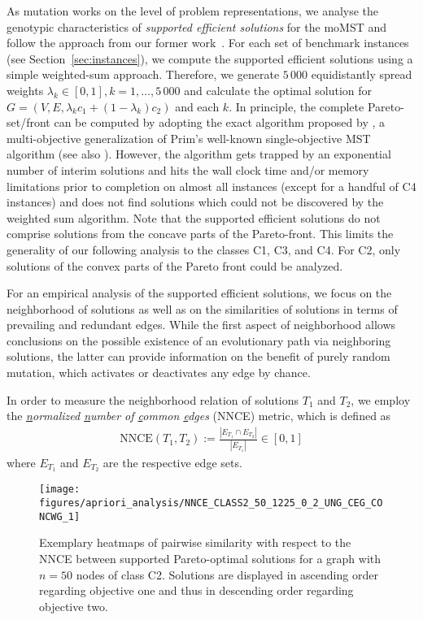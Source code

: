 \documentclass[twoside]{article}
\begin{document}
As mutation works on the level of problem representations, we analyse the genotypic characteristics of \emph{supported efficient solutions} for the moMST and follow the approach from our former work~\citep{BG2017ParetoBeneficial}. For each set of benchmark instances (see Section~\ref{sec:instances}), we compute the supported efficient solutions using a simple weighted-sum approach. Therefore, we generate $5\,000$ equidistantly spread weights $\lambda_k \in [0, 1], k = 1, \ldots, 5\,000$ and calculate the optimal solution for $G = (V, E, \lambda_k c_1 + (1 - \lambda_k)c_2)$ and each $k$. In principle, the complete Pareto-set/front can be computed by adopting the exact algorithm proposed by \citet{Corley1985}, a multi-objective generalization of Prim's well-known single-objective MST algorithm (see also \citet[p. 208ff]{Ehrgott2005}). However, the algorithm gets trapped by an exponential number of interim solutions and hits the wall clock time and/or memory limitations prior to completion on almost all instances (except for a handful of C4 instances) and does not find solutions which could not be discovered by the weighted sum algorithm. Note that the supported efficient solutions do not comprise solutions from the concave parts of the Pareto-front. This limits the generality of our following analysis to the classes C1, C3, and C4. For C2, only solutions of the convex parts of the Pareto front could be analyzed.

For an empirical analysis of the supported efficient solutions, we focus on the neighborhood of solutions as well as on the similarities of solutions in terms of prevailing and redundant edges. While the first aspect of neighborhood allows conclusions on the possible existence of an evolutionary path via neighboring solutions, the latter can provide information on the benefit of purely random mutation, which activates or deactivates any edge by chance.

In order to measure the neighborhood relation of solutions $T_1$ and $T_2$, we employ the \emph{\underline{n}ormalized \underline{n}umber of \underline{c}ommon \underline{e}dges} (NNCE) metric, which is defined as
\begin{align*}
  \text{NNCE}(T_1, T_2) := \frac{|E_{T_1} \cap E_{T_2}|}{|E_{T_1}|} \in [0, 1]
\end{align*}
where $E_{T_1}$ and $E_{T_2}$ are the respective edge sets.

\begin{figure}[tb]
  \centering
  \texttt{[image: figures/apriori\_analysis/NNCE\_CLASS2\_50\_1225\_0\_2\_UNG\_CEG\_CONCWG\_1]}
  \caption{Exemplary heatmaps of pairwise similarity with respect to the NNCE between supported Pareto-optimal solutions for a graph with $n = 50$ nodes of class C2. Solutions are displayed in ascending order regarding objective one and thus in descending order regarding objective two.}
  \label{fig:analysis_heatmaps}
\end{figure}
\end{document}
